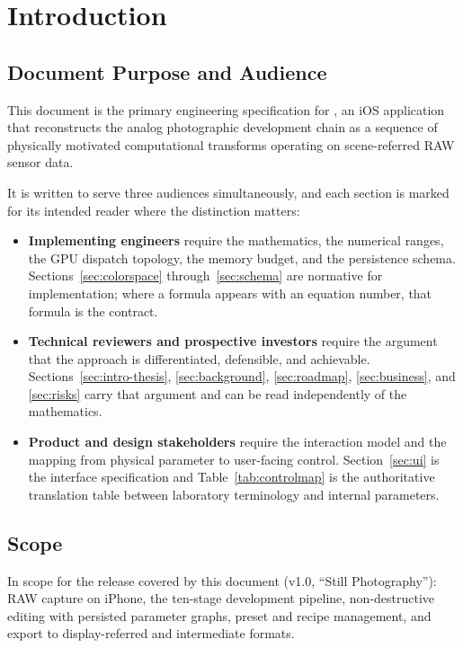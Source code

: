 \section{Introduction}

\subsection{Document Purpose and Audience}

This document is the primary engineering specification for \EM{}, an iOS
application that reconstructs the analog photographic development chain as a
sequence of physically motivated computational transforms operating on
scene-referred RAW sensor data.

It is written to serve three audiences simultaneously, and each section is
marked for its intended reader where the distinction matters:

\begin{itemize}
\item \textbf{Implementing engineers} require the mathematics, the numerical
ranges, the GPU dispatch topology, the memory budget, and the persistence
schema. Sections~\ref{sec:colorspace} through~\ref{sec:schema} are normative for
implementation; where a formula appears with an equation number, that formula
is the contract.
\item \textbf{Technical reviewers and prospective investors} require the
argument that the approach is differentiated, defensible, and achievable.
Sections~\ref{sec:intro-thesis}, \ref{sec:background}, \ref{sec:roadmap},
\ref{sec:business}, and \ref{sec:risks} carry that argument and can be read
independently of the mathematics.
\item \textbf{Product and design stakeholders} require the interaction model
and the mapping from physical parameter to user-facing control.
Section~\ref{sec:ui} is the interface specification and
Table~\ref{tab:controlmap} is the authoritative translation table between
laboratory terminology and internal parameters.
\end{itemize}

\subsection{Scope}

In scope for the release covered by this document (v1.0, ``Still Photography''):
RAW capture on iPhone, the ten-stage development pipeline, non-destructive
editing with persisted parameter graphs, preset and recipe management, and
export to display-referred and intermediate formats.

